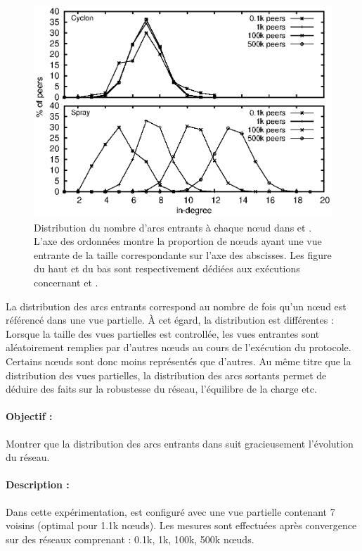 \begin{figure}
  \centering
  \includegraphics[width=.8\textwidth]{img/spray/histo.eps}
  \caption{\label{net:fig:inview} Distribution du nombre d'arcs entrants à
    chaque nœud dans \CYCLON et \SPRAY. L'axe des ordonnées montre la proportion
    de nœuds ayant une vue entrante de la taille correspondante sur l'axe des
    abscisses. Les figure du haut et du bas sont respectivement dédiées aux
    exécutions concernant \CYCLON et \SPRAY.}
\end{figure}

La distribution des arcs entrants correspond au nombre de fois qu'un nœud est
référencé dans une vue partielle. À cet égard, la distribution est différentes :
Lorsque la taille des vues partielles est controllée, les vues entrantes sont
aléatoirement remplies par d'autres nœuds au cours de l'exécution du
protocole. Certains nœuds sont donc moins représentés que d'autres.  Au même
titre que la distribution des vues partielles, la distribution des arcs sortants
permet de déduire des faits sur la robustesse du réseau, l'équilibre de la
charge etc. 

\paragraph{Objectif :} Montrer que la distribution des arcs entrants dans \SPRAY
suit gracieusement l'évolution du réseau.

\paragraph{Description :} Dans cette expérimentation, \CYCLON est configuré avec
une vue partielle contenant 7 voisins (optimal pour 1.1k nœuds). Les mesures
sont effectuées après convergence sur des réseaux comprenant : 0.1k, 1k, 100k,
500k nœuds.

